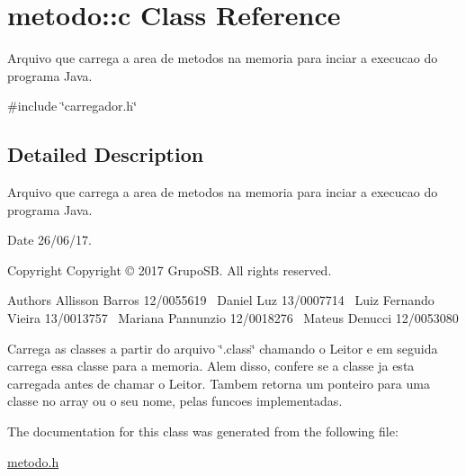 \hypertarget{classmetodo_1_1c}{}\section{metodo\+:\+:c Class Reference}
\label{classmetodo_1_1c}


Arquivo que carrega a area de metodos na memoria para inciar a execucao do programa Java.  




{\ttfamily \#include \char`\"{}carregador.\+h\char`\"{}}



\subsection{Detailed Description}
Arquivo que carrega a area de metodos na memoria para inciar a execucao do programa Java. 

\begin{DoxyDate}{Date}
26/06/17. 
\end{DoxyDate}
\begin{DoxyCopyright}{Copyright}
Copyright © 2017 Grupo\+SB. All rights reserved.
\end{DoxyCopyright}
\begin{DoxyAuthor}{Authors}
Allisson Barros 12/0055619~\newline
Daniel Luz 13/0007714~\newline
Luiz Fernando Vieira 13/0013757~\newline
Mariana Pannunzio 12/0018276~\newline
Mateus Denucci 12/0053080
\end{DoxyAuthor}
Carrega as classes a partir do arquivo \char`\"{}.\+class\char`\"{} chamando o Leitor e em seguida carrega essa classe para a memoria. Alem disso, confere se a classe ja esta carregada antes de chamar o Leitor. Tambem retorna um ponteiro para uma classe no array ou o seu nome, pelas funcoes implementadas. 

The documentation for this class was generated from the following file\+:\begin{DoxyCompactItemize}
\item 
\hyperlink{metodo_8h}{metodo.\+h}\end{DoxyCompactItemize}
